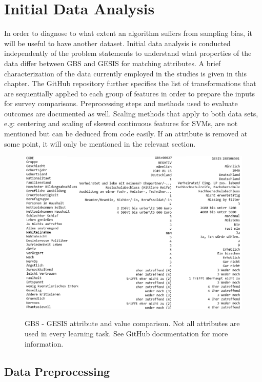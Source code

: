 \chapter{Initial Data Analysis}\label{Sec:Initial Data Analysis}

In order to diagnose to what extent an algorithm suffers from sampling bias, it will be useful to have another dataset. Initial data analysis is conducted independently of the problem statements to understand what properties of the data differ between GBS and GESIS for matching attributes. A brief characterization of the data currently employed in the studies is given in this chapter. The GitHub repository further specifies the list of transformations that are sequentially applied to each group of features in order to prepare the inputs for survey comparisons. Preprocessing steps and methods used to evaluate outcomes are documented as well. Scaling methods that apply to both data sets, e.g: centering and scaling of skewed continuous features for SVMs, are not mentioned but can be deduced from code easily. If an attribute is removed at some point, it will only be mentioned in the relevant section.

\begin{figure}[ht]
	\begin{center}
		\includegraphics[scale=0.52,angle=0]{fig/values_compare}
		\label{std}
		\caption{GBS - GESIS attribute and value comparison. Not all attributes are used in every learning task. See GitHub documentation for more information.}
	\end{center}
\end{figure}

\section{Data Preprocessing}


